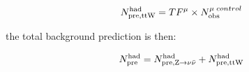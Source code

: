 \begin{equation}
  \label{equ:pre-ttw}
  N_{\rm pre, ttW}^{\rm had} = TF^{\mu} \times {\nobs^{\mu\;control}}
\end{equation}

the total background prediction is then:

\begin{equation}
  \label{equ:pre-ttw}
  N_{\rm pre}^{\rm had} =  N_{\rm pre, {\text Z} \rightarrow \nu\bar{\nu}}^{\rm had} + N_{\rm pre, ttW}^{\rm had}
\end{equation}
\clearpage
